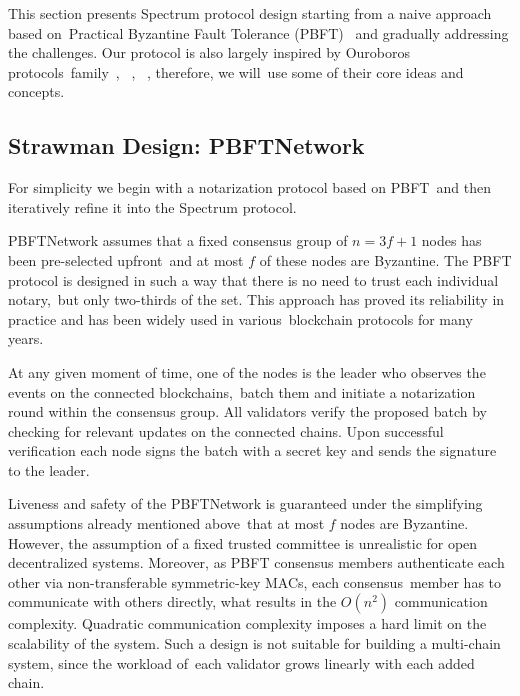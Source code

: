 This section presents Spectrum protocol design starting from a naive approach based on\
Practical Byzantine Fault Tolerance (PBFT)~\cite{Castro2001} and gradually addressing the challenges.
Our protocol is also largely inspired by Ouroboros protocols\
family~\cite{cryptoeprint:2017/573}, ~\cite{Badertscher2018}, ~\cite{cryptoeprint:2019/838}, therefore, we will\
use some of their core ideas and concepts.

\subsection{Strawman Design: PBFTNetwork}\label{subsec:strawman-design}

For simplicity we begin with a notarization protocol based on PBFT\
and then iteratively refine it into the Spectrum protocol.

PBFTNetwork assumes that a fixed consensus group of ${n = 3f + 1}$ nodes has been pre-selected upfront\
and at most $f$ of these nodes are Byzantine.
The PBFT protocol is designed in such a way that there is no need to trust each individual notary,\
but only two-thirds of the set.
This approach has proved its reliability in practice and has been widely used in various\
blockchain protocols for many years.

At any given moment of time, one of the nodes is the leader who observes the events on the connected blockchains,\
batch them and initiate a notarization round within the consensus group.
All validators verify the proposed batch by checking for relevant updates on the connected chains.
Upon successful verification each node signs the batch with a secret key and sends the signature to the leader.

Liveness and safety of the PBFTNetwork is guaranteed under the simplifying assumptions already mentioned above\
that at most $f$ nodes are Byzantine.
However, the assumption of a fixed trusted committee is unrealistic for open decentralized systems.
Moreover, as PBFT consensus members authenticate each other via non-transferable symmetric-key MACs, each consensus\
member has to communicate with others directly, what results in the $O(n^2)$ communication complexity.
Quadratic communication complexity imposes a hard limit on the scalability of the system.
Such a design is not suitable for building a multi-chain system, since the workload of\
each validator grows linearly with each added chain.

